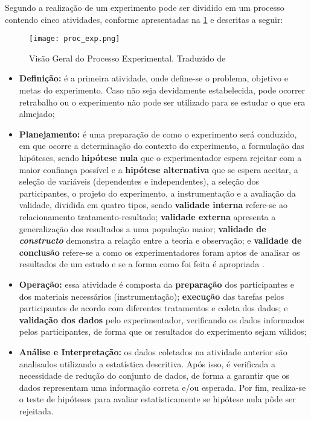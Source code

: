 Segundo \citealt{wohlin2012experimentation} a realização de um experimento pode ser dividido em um processo contendo cinco atividades, conforme apresentadas na \ref{fig:proc_exp} e descritas a seguir:

\begin{figure}[htb]
	\centering					
	{\texttt{[image: proc\_exp.png]}}
	
	\caption{Visão Geral do Processo Experimental. Traduzido de \citet{wohlin2012experimentation}}
	\label{fig:proc_exp}
\end{figure}


\begin{itemize}
	\item \textbf{Definição:} é a primeira atividade, onde define-se o problema, objetivo e metas do experimento. Caso não seja devidamente estabelecida, pode ocorrer retrabalho ou o experimento não pode ser utilizado para se estudar o que era almejado;

	\item \textbf{Planejamento:} é uma preparação de como o experimento será conduzido, em que ocorre a determinação do contexto do experimento, a formulação das hipóteses, sendo \textbf{hipótese nula} que o experimentador espera rejeitar com a maior confiança possível e a \textbf{hipótese alternativa} que se espera aceitar, a seleção de variáveis (dependentes e independentes), a seleção dos participantes, o projeto do experimento, a instrumentação e a avaliação da validade, dividida em quatro tipos, sendo \textbf{validade interna} refere-se ao relacionamento tratamento-resultado; \textbf{validade externa} apresenta a generalização dos resultados a uma população maior; \textbf{validade de \textit{constructo}} demonstra a relação entre a teoria e observação; e \textbf{validade de conclusão} refere-se a como os experimentadores foram aptos de analisar os resultados de um estudo e se a forma como foi feita é apropriada \cite{kitchenham2015evidence}.

	\item \textbf{Operação:} essa atividade é composta da \textbf{preparação} dos participantes e dos materiais necessários (instrumentação); \textbf{execução} das tarefas pelos participantes de acordo com diferentes tratamentos e coleta dos dados; e \textbf{validação dos dados} pelo experimentador, verificando os dados informados pelos participantes, de forma que os resultados do experimento sejam válidos; 
	
	\item \textbf{Análise e Interpretação:} os dados coletados na atividade anterior são analisados utilizando a estatística descritiva. Após isso, é verificada a necessidade de redução do conjunto de dados, de forma a garantir que os dados representam uma informação correta e/ou esperada. Por fim, realiza-se o teste de hipóteses para avaliar estatisticamente se hipótese nula pôde ser rejeitada. 
	

\end{itemize}

